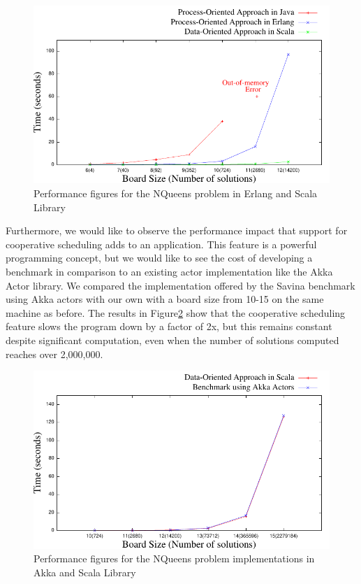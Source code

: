 \begin{figure}
	\centering
	\includegraphics[scale=.7]{erlj8.pdf}
	\caption{Performance figures for the NQueens problem in Erlang and Scala Library}
	\label{ej}
\end{figure}

\par Furthermore, we would like to observe the performance impact that support for cooperative scheduling adds to an application. This feature is a powerful programming concept, but we would like to see the cost of developing a benchmark in comparison to an existing actor implementation like the Akka Actor library. We compared the implementation offered by the Savina benchmark using Akka actors with our own with a board size from 10-15 on the same machine as before. The results in Figure\ref{aj} show that the cooperative scheduling feature slows the program down by a factor of 2x, but this remains constant despite significant computation, even when the number of solutions computed reaches over 2,000,000. 

\begin{figure}
\centering
\includegraphics[scale=.7]{akka8.pdf}
\caption{Performance figures for the NQueens problem implementations in Akka and Scala Library}
\label{aj}
\end{figure}

